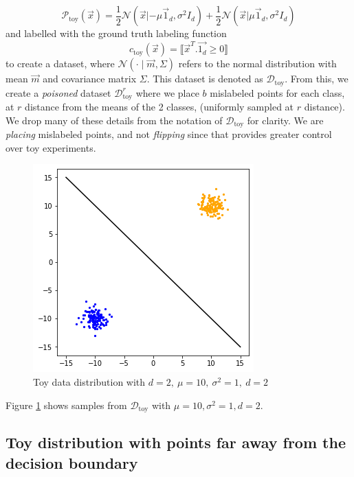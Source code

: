 \documentclass{ociamthesis}
\begin{document}
\begin{equation*}
    \mathcal{P}_\text{toy}(\vec{x})=\frac{1}{2} \mathcal{N}(\vec{x}|-\mu \vec{1}_d,
    \sigma^2 I_d) + \frac{1}{2} \mathcal{N}(\vec{x}| \mu \vec{1}_d, \sigma^2 I_d)
\end{equation*}
and labelled with the ground truth labeling function 
\begin{equation*}
    c_\text{toy}(\vec{x}) = \llbracket
    \vec{x}^T.\vec{1_d} \geq 0 \rrbracket 
\end{equation*}
to create a dataset, where $\mathcal{N}(\cdot \mid \vec{m}, \Sigma)$ refers to
the normal distribution with mean $\vec{m}$ and covariance matrix $\Sigma$. This
dataset is denoted as $\mathcal{D}_\text{toy}$. From this, we create a
\emph{poisoned} dataset $\mathcal{D}_\text{toy}^r$ where we place $b$ mislabeled
points for each class, at $r$ distance from the means of the 2 classes,
(uniformly sampled at $r$ distance). We drop many of these details from the
notation of $\mathcal{D}_\text{toy}$ for clarity. We are \emph{placing}
mislabeled points, and not \emph{flipping} since that provides greater control
over toy experiments.

\begin{figure}[!h]
    \centering
    \includegraphics[scale=0.4]{sample_data}
    \caption{Toy data distribution with $d=2,~\mu=10,~\sigma^2=1,~d=2$}
    \label{fig:data_sample}
\end{figure}

Figure \ref{fig:data_sample} shows samples from $\mathcal{D}_\text{toy}$ with
$\mu=10, \sigma^2=1, d=2$.


\subsection{Toy distribution with points far away from the decision boundary}
\end{document}
